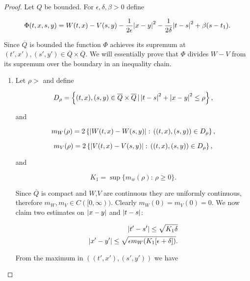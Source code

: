 \begin{proof}
    
    Let $Q$ be bounded. For $\epsilon, \delta, \beta >0$ define
    
    \begin{equation}\label{4-2-InProofSup:phi}
        \Phi(t,x,s,y) = W(t,x) - V(s,y) - \frac{1}{2\epsilon} \abs{x-y}^2 -\frac{1}{2\delta} \abs{t-s}^2 + \beta(s-t_1).   
    \end{equation}

    Since $\overline{Q}$ is bounded the function $\Phi$ achieves its supremum at $(t',x'),(s',y')\in\overline{Q}\times\overline{Q}$. We will essentially prove 
    that $\Phi$ divides $W-V$ from its supremum over the boundary in an inequality chain.
    
    \begin{enumerate}
        \item Let $\rho>$ and define
        
        \begin{equation}\label{4-2-InProofSup:Drho}
            D_{\rho} = \left\{(t,x),(s,y)\in\overline{Q}\times\overline{Q}\,|\,\abs{t-s}^2+\abs{x-y}^2\leq\rho\right\},
        \end{equation}

        and 

        \[m_W(\rho)=2\left\{\abs{W(t,x)-W(s,y)}:\,((t,x),(s,y))\in D_{\rho}\right\},\]

        \[m_V(\rho)=2\left\{\abs{V(t,x)-V(s,y)}:\,((t,x),(s,y))\in D_{\rho}\right\},\]

        and 

        \[K_1 = \sup\{m_w(\rho):\,\rho\geq0\}.\]

        Since $\overline{Q}$ is compact and $W$,$V$ are continuous they are uniformly continuous, therefore $m_W,m_V\in C([0,\infty))$. Clearly 
        $m_W(0)=m_V(0)=0$. We now claim two estimates on $\abs{x-y}$ and $\abs{t-s}$:

        \begin{equation}
            \begin{aligned}
                \abs{t'-s'}\leq\sqrt{K_1\delta} \\
                \abs{x'-y'}\leq \sqrt{\epsilon m_W(K_1[\epsilon+\delta])}.
            \end{aligned}
        \end{equation}

        From the maximum in $((t',x'),(s',y'))$ we have


\end{enumerate}
\end{proof}

